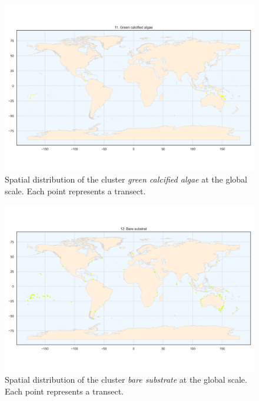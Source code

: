 \begin{figure}
\hypertarget{fig:chap2figS13}{%
\centering
\includegraphics{03-Chapitre2/figures/supplementary/06-spatial-cluster_distribution_cluster_10.png}
\caption{Spatial distribution of the cluster \emph{green calcified
algae} at the global scale. Each point represents a
transect.}\label{fig:chap2figS13}
}
\end{figure}

\begin{figure}
\hypertarget{fig:chap2figS14}{%
\centering
\includegraphics{03-Chapitre2/figures/supplementary/06-spatial-cluster_distribution_cluster_11.png}
\caption{Spatial distribution of the cluster \emph{bare substrate} at
the global scale. Each point represents a
transect.}\label{fig:chap2figS14}
}
\end{figure}


